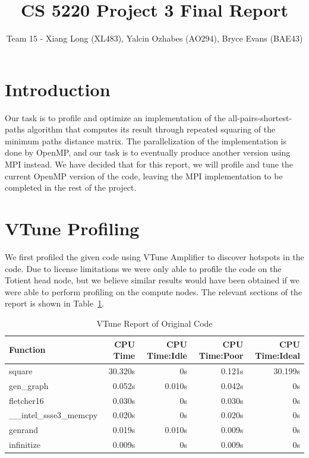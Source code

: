 \documentclass{article}
\begin{document}
\title{CS 5220 Project 3 Final Report}
\author{Team 15 - Xiang Long (XL483), Yalcin Ozhabes (AO294), Bryce Evans (BAE43)}

\maketitle

\section{Introduction}

Our task is to profile and optimize an implementation of the all-pairs-shortest-paths algorithm that computes its result through repeated squaring of the minimum paths distance matrix. The parallelization of the implementation is done by OpenMP, and our task is to eventually produce another version using MPI instead. We have decided that for this report, we will profile and tune the current OpenMP version of the code, leaving the MPI implementation to be completed in the rest of the project.

\section{VTune Profiling}

We first profiled the given code using VTune Amplifier to discover hotspots in the code. Due to license limitations we were only able to profile the code on the Totient head node, but we believe similar results would have been obtained if we were able to perform profiling on the compute nodes. The relevant sections of the report is shown in Table~\ref{vtune}.

\begin{table}[h]
 \centering
  \begin{tabular}{ | l | r | r | r | r | }
 \hline
Function             & CPU Time &  CPU Time:Idle & CPU Time:Poor & CPU Time:Ideal \\ \hline
square               &  30.320s &             0s &        0.121s &        30.199s \\
gen\_graph            &   0.052s &         0.010s &        0.042s &             0s \\
fletcher16           &   0.030s &             0s &        0.030s &             0s \\
\_\_intel\_ssse3\_memcpy &   0.020s &             0s &        0.020s &             0s \\
genrand              &   0.019s &         0.010s &        0.009s &             0s \\
infinitize           &   0.009s &             0s &        0.009s &             0s \\ \hline
\end{tabular}
 \caption{VTune Report of Original Code}
 \label{vtune}
\end{table}
\end{document}
